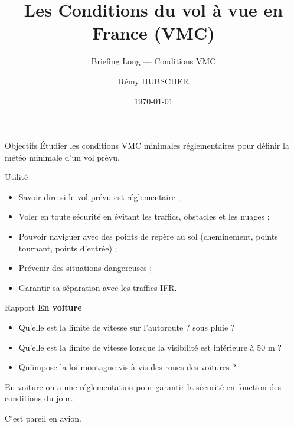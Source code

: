 \documentclass{beamer}
\author{Rémy HUBSCHER}
\begin{document}
  \title[Briefing Long — Conditions VMC]{Les Conditions du vol à vue en France (VMC)}
  \subtitle{Briefing Long — Conditions VMC}
\date{\today} 

\begin{frame}[plain]
  \titlepage
\end{frame}

\begin{frame}{Objectifs}
  Étudier les conditions VMC minimales réglementaires pour définir la
  météo minimale d'un vol prévu.
\end{frame}

\begin{frame}{Utilité}
  \begin{itemize} 
    \item Savoir dire si le vol prévu est réglementaire ; \pause
    \item Voler en toute sécurité en évitant les traffics, obstacles et les nuages ; \pause
    \item Pouvoir naviguer avec des points de repère au sol (cheminement, points tournant, points d'entrée) ; \pause
    \item Prévenir des situations dangereuses ; \pause
    \item Garantir sa séparation avec les traffics IFR.
  \end{itemize}  
\end{frame}

\begin{frame}{Rapport}
  \textbf{En voiture}
  
  \begin{itemize}
    \item Qu'elle est la limite de vitesse sur l'autoroute ? \pause sous pluie ? \pause
    \item Qu'elle est la limite de vitesse lorsque la visibilité est inférieure à 50 m ? \pause
    \item Qu'impose la loi montagne vis à vis des roues des voitures ? \pause
  \end{itemize}

  \vspace*{1em}
  En voiture on a une réglementation pour garantir la sécurité en fonction des conditions du jour.
  \pause
  
  \vspace*{1em}
  C'est pareil en avion.
\end{frame}
\end{document}
